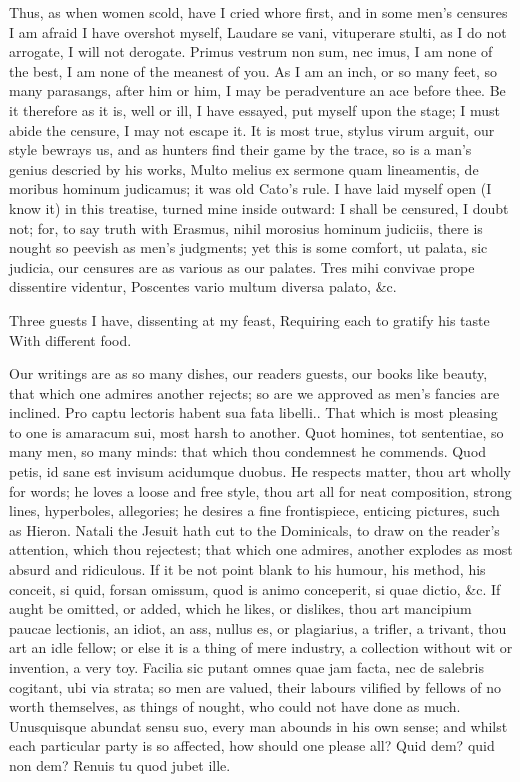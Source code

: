 {Thus, as when women scold, have I cried whore first, and in some men's
censures I am afraid I have overshot myself, Laudare se vani,
vituperare stulti, as I do not arrogate, I will not derogate. Primus
vestrum non sum, nec imus, I am none of the best, I am none of the
meanest of you. As I am an inch, or so many feet, so many parasangs,
after him or him, I may be peradventure an ace before thee. Be it
therefore as it is, well or ill, I have essayed, put myself upon the
stage; I must abide the censure, I may not escape it. It is most true,
stylus virum arguit, our style bewrays us, and as hunters find
their game by the trace, so is a man's genius descried by his works,
Multo melius ex sermone quam lineamentis, de moribus hominum judicamus;
it was old Cato's rule. I have laid myself open (I know it) in this
treatise, turned mine inside outward: I shall be censured, I doubt not;
for, to say truth with Erasmus, nihil morosius hominum judiciis, there
is nought so peevish as men's judgments; yet this is some comfort, ut
palata, sic judicia, our censures are as various as our palates.
Tres mihi convivae prope dissentire videntur,
Poscentes vario multum diversa palato, \&c.

Three guests I have, dissenting at my feast,
Requiring each to gratify his taste
With different food.

Our writings are as so many dishes, our readers guests, our books like
beauty, that which one admires another rejects; so are we approved as
men's fancies are inclined. Pro captu lectoris habent sua fata
libelli.. That which is most pleasing to one is amaracum sui, most
harsh to another. Quot homines, tot sententiae, so many men, so many
minds: that which thou condemnest he commends. Quod petis, id sane
est invisum acidumque duobus. He respects matter, thou art wholly for
words; he loves a loose and free style, thou art all for neat
composition, strong lines, hyperboles, allegories; he desires a fine
frontispiece, enticing pictures, such as Hieron. Natali the Jesuit
hath cut to the Dominicals, to draw on the reader's attention, which
thou rejectest; that which one admires, another explodes as most absurd
and ridiculous. If it be not point blank to his humour, his method, his
conceit, si quid, forsan omissum, quod is animo conceperit, si
quae dictio, \&c. If aught be omitted, or added, which he likes, or
dislikes, thou art mancipium paucae lectionis, an idiot, an ass, nullus
es, or plagiarius, a trifler, a trivant, thou art an idle fellow; or
else it is a thing of mere industry, a collection without wit or
invention, a very toy. Facilia sic putant omnes quae jam facta,
nec de salebris cogitant, ubi via strata; so men are valued, their
labours vilified by fellows of no worth themselves, as things of
nought, who could not have done as much. Unusquisque abundat sensu suo,
every man abounds in his own sense; and whilst each particular party is
so affected, how should one please all?
Quid dem? quid non dem? Renuis tu quod jubet ille.

}
